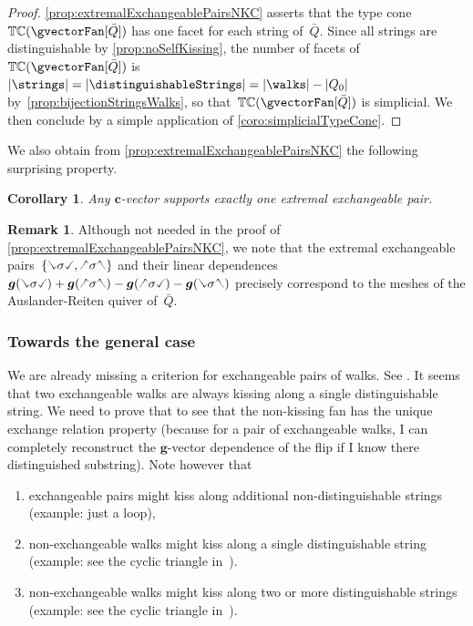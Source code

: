 \documentclass{amsart}
\newtheorem{corollary}[theorem]{Corollary}
\theoremstyle{definition}
\newtheorem{remark}[theorem]{Remark}
\renewcommand{\b}[1]{{\boldsymbol{#1}}} %
\newcommand{\gvector}[1]{\b{g}(#1)} %
\newcommand{\typeCone}{\mathbb{TC}} %
\newcommand{\quiver}{\bar Q} %
\newcommand{\hL}{\text{\rotatebox[origin=c]{180}{\checked}}}
\newcommand{\hR}{\text{\rotatebox[origin=c]{180}{\reflectbox{\checked}}}}
\newcommand{\cL}{\text{\reflectbox{\checked}}}
\newcommand{\cR}{\text{\checked}}
\newcommand{\hh}[1]{\hL#1\hR} %
\newcommand{\cc}[1]{\cL#1\cR} %
\newcommand{\hc}[1]{\hL#1\cR} %
\newcommand{\ch}[1]{\cL#1\hR} %
\begin{document}
\begin{proof}
\cref{prop:extremalExchangeablePairsNKC} asserts that the type cone~$\typeCone(\gvectorFan[\quiver])$ has one facet for each string of~$\quiver$.
Since all strings are distinguishable by \cref{prop:noSelfKissing}, the number of facets of~$\typeCone(\gvectorFan[\quiver])$ is $|\strings| = |\distinguishableStrings| = |\walks| - |Q_0|$ by~\cref{prop:bijectionStringsWalks}, so that~$\typeCone(\gvectorFan[\quiver])$ is simplicial. We then conclude by a simple application of \cref{coro:simplicialTypeCone}.
\end{proof}

We also obtain from \cref{prop:extremalExchangeablePairsNKC} the following surprising property.

\begin{corollary}
Any $\b{c}$-vector supports exactly one extremal exchangeable pair.
\end{corollary}

\begin{remark}
\label{rem:meshARquiver}
Although not needed in the proof of \cref{prop:extremalExchangeablePairsNKC}, we note that the extremal exchangeable pairs~$\{\cc{\sigma}, \hh{\sigma}\}$ and their linear dependences~${\gvector{\cc{\sigma}} + \gvector{\hh{\sigma}} - \gvector{\hc{\sigma}} - \gvector{\ch{\sigma}}}$ precisely correspond to the meshes of the Auslander-Reiten quiver of~$\quiver$.
\end{remark}

\subsubsection{Towards the general case}

We are already missing a criterion for exchangeable pairs of walks. See \cite[Sect.~9]{BrustleDouvilleMousavandThomasYildirim}.
It seems that two exchangeable walks are always kissing along a single distinguishable string.
We need to prove that to see that the non-kissing fan has the unique exchange relation property (because for a pair of exchangeable walks, I can completely reconstruct the $\b{g}$-vector dependence of the flip if I know there distinguished substring).
Note however that
\begin{enumerate}
\item exchangeable pairs might kiss along additional non-distinguishable strings (example: just a loop),
\item non-exchangeable walks might kiss along a single distinguishable string (example: see the cyclic triangle in~\cite{PaluPilaudPlamondon-nonkissing}).
\item non-exchangeable walks might kiss along two or more distinguishable strings (example: see the cyclic triangle in~\cite{PaluPilaudPlamondon-nonkissing}).
\end{enumerate}
\end{document}
